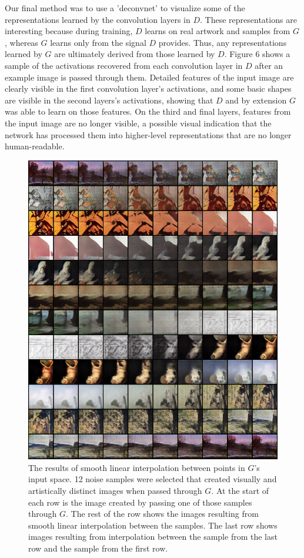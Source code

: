 \documentclass[10pt,twocolumn,letterpaper]{article}
\begin{document}
Our final method was to use a 'deconvnet' to visualize some of the representations learned by the convolution layers in $ D $. These representations are interesting because during training, $ D $ learns on real artwork and samples from $ G $, whereas $ G $ learns only from the signal $ D $ provides. Thus, any representations learned by $ G $ are ultimately derived from those learned by $ D $. Figure 6 shows a sample of the activations recovered from each convolution layer in $ D $ after an example image is passed through them. Detailed features of the input image are clearly visible in the first convolution layer's activations, and some basic shapes are visible in the second layers's activations, showing that $ D $ and by extension $ G $ was able to learn on those features. On the third and final layers, features from the input image are no longer visible, a possible visual indication that the network has processed them into higher-level representations that are no longer human-readable. 

\begin{figure}[t]
	\begin{center}
		\includegraphics[width=0.9\linewidth]{interp.png}
	\end{center}
	\caption{The results of smooth linear interpolation between points in $ G $'s input space. 12 noise samples were selected that created visually and artistically distinct images when passed through $ G $. At the start of each row is the image created by passing one of those samples through $ G $. The rest of the row shows the images resulting from smooth linear interpolation between the samples. The last row shows images resulting from interpolation between the sample from the last row and the sample from the first row. }
	\label{fig:long}
	\label{fig:onecol}
\end{figure}
\end{document}

